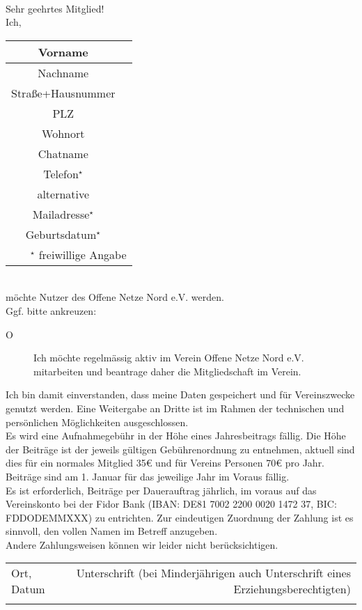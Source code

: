 \documentclass[a4paper,8pt]{article}
\begin{document}
\ \\

Sehr geehrtes Mitglied!\\

Ich,\\
\begin{tabular}{||c|p{10cm}||}
\hline
\hline
Vorname &\\
\hline
Nachname &\\
\hline
Straße+Hausnummer &\\
\hline
PLZ &\\
\hline
Wohnort &\\
\hline
Chatname &\\
\hline
Telefon$^\star$ &\\
\hline
alternative & \multirow{2}{*}{} \\
Mailadresse$^\star$ &\\
\hline
Geburtsdatum$^\star$ &\\
\hline
\hline
\multicolumn{2}{r}{\tiny $^\star$ freiwillige Angabe}
\end{tabular}
\\
möchte Nutzer des Offene Netze Nord e.V. werden.\\

Ggf. bitte ankreuzen:
\begin{description}
\item[O] Ich möchte regelmässig aktiv im Verein Offene Netze Nord e.V. mitarbeiten und beantrage daher die Mitgliedschaft im Verein.
\end{description}

Ich bin damit einverstanden, dass meine Daten gespeichert und für Vereinszwecke genutzt werden.
Eine Weitergabe an Dritte ist im Rahmen der technischen und persönlichen Möglichkeiten ausgeschlossen.
\\

Es wird eine Aufnahmegebühr in der Höhe eines Jahresbeitrags fällig.
Die Höhe der Beiträge ist der jeweils gültigen Gebührenordnung zu entnehmen,
aktuell sind dies für ein normales Mitglied 35\euro{} und für Vereins Personen 70\euro{} pro Jahr.
\\

Beiträge sind am 1. Januar für das jeweilige Jahr im Voraus fällig.
\\

Es ist erforderlich, Beiträge per Dauerauftrag jährlich, im voraus auf das Vereinskonto bei der Fidor Bank
(IBAN: DE81 7002 2200 0020 1472 37, BIC: FDDODEMMXXX) zu ent\-richten.
Zur eindeutigen Zuordnung der Zahlung ist es sinnvoll, den vollen Namen im Betreff anzugeben.
\\

Andere Zahlungsweisen können wir leider nicht berücksichtigen.
\\


\begin{tabular}{l r}
&\\
\hline
Ort, Datum & Unterschrift (bei Minderjährigen auch Unterschrift eines Erziehungsberechtigten)\\
&\\
\end{tabular}
\end{document}
